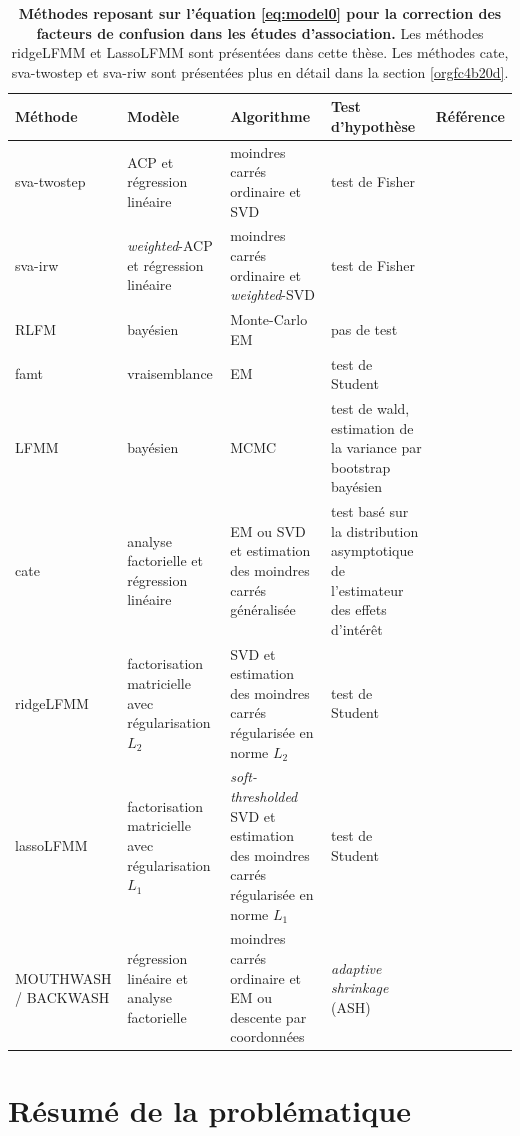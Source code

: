 \documentclass[12pt,a4paper,twoside]{ugathesis}
\begin{document}
\begin{table}
\caption{\label{tab:org6b8e567}
\textbf{Méthodes reposant sur l'équation \ref{eq:model0} pour la correction des facteurs de confusion dans les études d'association.} Les méthodes ridgeLFMM et LassoLFMM sont présentées dans cette thèse. Les méthodes cate, sva-twostep et sva-riw sont présentées plus en détail dans la section \ref{orgfc4b20d}.}
\centering
\begin{tabular}{p{3cm}|p{4.2cm}p{4cm}p{5cm}|p{4cm}}
\hline
Méthode & Modèle & Algorithme & Test d'hypothèse & Référence\\
\hline
sva-twostep & ACP et régression linéaire & moindres carrés ordinaire et SVD & test de Fisher & \citet{article_Leek_Storey_2007}\\
sva-irw & \emph{weighted}-ACP et régression linéaire & moindres carrés ordinaire et \emph{weighted}-SVD & test de Fisher & \citet{article_Leek_Storey_2008}\\
RLFM & bayésien & Monte-Carlo EM & pas de test & \citet{agarwal09_regres}\\
famt & vraisemblance & EM & test de Student & \citet{friguet09_factor_model_approac_to_multip}\\
LFMM & bayésien & MCMC & test de wald, estimation de la variance par bootstrap bayésien & \citet{Frichot_2013}\\
cate & analyse factorielle et régression linéaire & EM ou SVD et estimation des moindres carrés généralisée & test basé sur la distribution asymptotique de l'estimateur des effets d'intérêt & \citet{wang2015confounder}\\
ridgeLFMM & factorisation matricielle avec régularisation \(L_{2}\) & SVD et estimation des moindres carrés régularisée en norme \(L_{2}\) & test de Student & \\
lassoLFMM & factorisation matricielle avec régularisation \(L_{1}\) & \emph{soft-thresholded} SVD et estimation des moindres carrés régularisée en norme \(L_{1}\) & test de Student & \\
MOUTHWASH / BACKWASH & régression linéaire et analyse factorielle & moindres carrés ordinaire et EM ou descente par coordonnées & \emph{adaptive shrinkage} (ASH) \citep{stephens16_false_discov_rates} & \citet{gerard2017empirical}\\
\end{tabular}
\end{table}

\section{Résumé de la problématique}
\label{sec:orgdf7075b}
\end{document}
